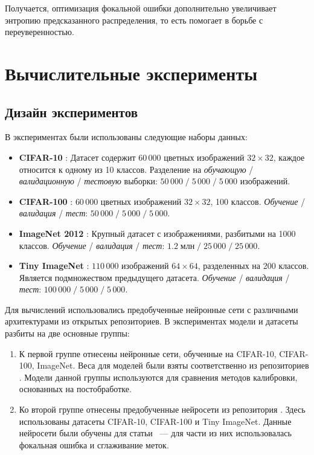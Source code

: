 \documentclass[12pt]{article}
\begin{document}
Получается, оптимизация фокальной ошибки дополнительно увеличивает энтропию предсказанного распределения, то есть помогает в борьбе с переуверенностью.

\section{Вычислительные эксперименты}\label{sec:experiments}

\subsection{Дизайн экспериментов}

В экспериментах были использованы следующие наборы данных:
\begin{itemize}
    \item \textbf{CIFAR-10} \cite{cifar}: Датасет содержит $60\,000$ цветных изображений $32\times 32$, каждое относится к одному из 10 классов. Разделение на \emph{обучающую} / \emph{валидационную} / \emph{тестовую} выборки: $50\,000\;/\;5\,000\;/\;5\,000$ изображений.
    \item \textbf{CIFAR-100} \cite{cifar}: $60\,000$ цветных изображений $32\times 32$, 100 классов. \emph{Обучение} / \emph{валидация} / \emph{тест}: $50\,000\;/\;5\,000\;/\;5\,000$.
    \item \textbf{ImageNet 2012} \cite{imagenet}: Крупный датасет с изображениями, разбитыми на 1000 классов. \emph{Обучение} / \emph{валидация} / \emph{тест}: $1.2\;\text{млн}\;/\;25\,000\;/\;25\,000$.
    \item \textbf{Tiny ImageNet} \cite{imagenet}: $110\,000$ изображений $64\times 64$, разделенных на 200 классов. Является подмножеством предыдущего датасета. \emph{Обучение} / \emph{валидация} / \emph{тест}: $100\,000\;/\;5\,000\;/\;5\,000$.
\end{itemize}

Для вычислений использовались предобученные нейронные сети с различными архитектурами из открытых репозиториев. В экспериментах модели и датасеты разбиты на две основные группы:

\begin{enumerate}
    \item К первой группе отнесены нейронные сети, обученные на CIFAR-10, CIFAR-100, ImageNet. Веса для моделей были взяты соответственно из репозиториев \cite{pretrained_cifar10, pretrained_cifar100, pretrained_imagenet}. Модели данной группы используются для сравнения методов калибровки, основанных на постобработке.
    \item Ко второй группе отнесены предобученные нейросети из репозитория \cite{focal_github}. Здесь использованы датасеты CIFAR-10, CIFAR-100 и Tiny ImageNet. Данные нейросети были обучены для статьи \cite{focal_calib}~--- для части из них использовалась фокальная ошибка и сглаживание меток.
\end{enumerate}
\end{document}
